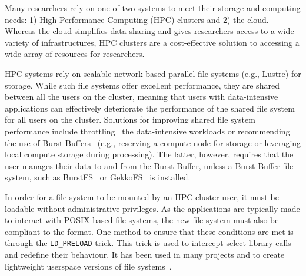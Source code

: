 \documentclass[fleqn,10pt]{wlscirep}
\begin{document}
    
    
    
    Many researchers rely on one of two systems to meet their storage and
    computing needs: 1) High Performance Computing (HPC) clusters and 2) the
    cloud. Whereas the cloud simplifies data sharing and gives researchers
    access to a wide variety of infrastructures, HPC clusters are a
    cost-effective solution to accessing a wide array of resources for
    researchers. %
    
    HPC systems rely on scalable network-based parallel file systems (e.g.,
    Lustre) for storage. While such file systems offer excellent performance,
    they are shared between all the users on the cluster, meaning that users
    with data-intensive applications can effectively deteriorate the performance
    of the shared file system for all users on the cluster. Solutions for
    improving shared file system performance include
    throttling~\cite{huang2020ooops} the data-intensive workloads or
    recommending the use of Burst Buffers~\cite{bb} (e.g., reserving a compute
    node for storage or leveraging local compute storage during processing). The
    latter, however, requires that the user manages their data to and from the
    Burst Buffer, unless a Burst Buffer file system, such as
    BurstFS~\cite{burstfs} or GekkoFS~\cite{gekkofs} is installed.
    
    In order for a file system to be mounted by an HPC cluster user, it must be
    loadable without administrative privileges. As the applications are
    typically made to interact with POSIX-based file systems, the new file
    system must also be compliant to the format. One method to ensure that these
    conditions are met is through the \texttt{LD\_PRELOAD} trick. This trick is
    used to intercept select library calls and redefine their behaviour. It has
    been used in many projects and to create lightweight userspace versions of
    file systems~\cite{xtreemfs,burstfs,gekkofs}. 
    
\end{document}
